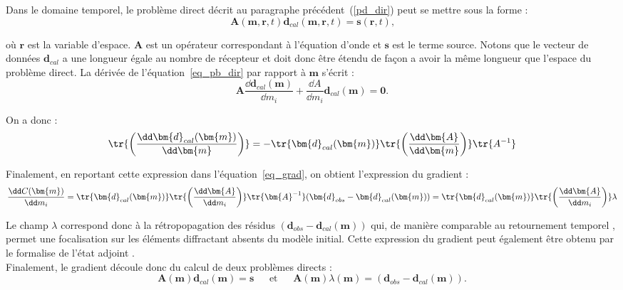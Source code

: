 Dans le domaine temporel, le problème direct décrit au paragraphe précédent~(\ref{pd_dir}) peut se mettre sous la forme :
\begin{equation}
	\bm{A}(\bm{m},\bm{r},t)\bm{d}_{cal}(\bm{m},\bm{r},t)=\bm{s}(\bm{r},t)\text{,}
	\label{eq_pb_dir}
\end{equation}

où $\bm{r}$ est la variable d'espace. $\bm{A}$ est un opérateur correspondant à l'équation d'onde et $\bm{s}$ est le terme source. Notons que le vecteur de données $\bm{d}_{cal}$ a une longueur égale au nombre de récepteur et doit donc être étendu de façon a avoir la même longueur que l'espace du problème direct. La dérivée de l'équation~\ref{eq_pb_dir} par rapport à $\bm{m}$ s'écrit : 
\begin{equation}
	\bm{A} \frac{\dd \bm{d}_{cal}(\bm{m})}{\dd m_{i}} + \frac{\dd A}{\dd m_{i}}\bm{d}_{cal}(\bm{m}) = \bm{0} \text{.}
\end{equation}

On a donc : 
\begin{equation}
	\tr{\left( \frac{\dd \bm{d}_{cal}(\bm{m})}{\dd \bm{m}}  \right)} = - \tr{\bm{d}_{cal}(\bm{m})} \tr{\left( \frac{\dd \bm{A}}{\dd \bm{m}} \right)} \tr{A^{-1}}
	\label{sub}
\end{equation} 	

Finalement, en reportant cette expression dans l'équation~\ref{eq_grad}, on obtient l'expression du gradient : 
\begin{equation}
	 \frac{\dd C (\bm{m})}{\dd m_{i}} = \tr{\bm{d}_{cal}(\bm{m})}  \tr{\left( \frac{\dd \bm{A}}{\dd m_{i}}\right)} \tr{\bm{A}^{-1}} (\bm{d}_{obs} - \bm{d}_{cal}(\bm{m})) = \tr{\bm{d}_{cal}(\bm{m})} \tr{\left( \frac{\dd \bm{A}}{\dd m_{i}}\right)} \lambda
\end{equation}


Le champ $\lambda$ correspond donc à la rétropopagation des résidus $( \bm{d}_{obs} - \bm{d}_{cal}(\bm{m}))$ qui, de manière comparable au retournement temporel \citep{prada_2002}, permet une focalisation sur les éléments diffractant absents du modèle initial. Cette expression du gradient peut également être obtenu par le formalise de l'état adjoint \citep{plessix}.\\
Finalement, le gradient découle donc du calcul de deux problèmes directs : 
\begin{equation*}
	\bm{A}(\bm{m})\bm{d}_{cal}(\bm{m})=\bm{s} ~~~~~~~\text{et}~~~~~~~\bm{A}(\bm{m}) \lambda(\bm{m})=( \bm{d}_{obs} - \bm{d}_{cal}(\bm{m})).
\end{equation*}

